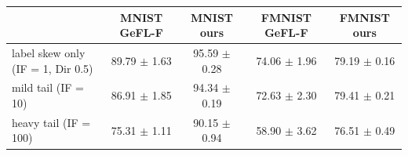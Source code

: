 \begin{tabular}{lcccc}
\toprule
 & MNIST GeFL-F & MNIST ours & FMNIST GeFL-F & FMNIST ours \\
\midrule
label skew only (IF = 1, Dir 0.5) & 89.79 $\pm$ 1.63 & 95.59 $\pm$ 0.28 & 74.06 $\pm$ 1.96 & 79.19 $\pm$ 0.16 \\
mild tail (IF = 10) & 86.91 $\pm$ 1.85 & 94.34 $\pm$ 0.19 & 72.63 $\pm$ 2.30 & 79.41 $\pm$ 0.21 \\
heavy tail (IF = 100) & 75.31 $\pm$ 1.11 & 90.15 $\pm$ 0.94 & 58.90 $\pm$ 3.62 & 76.51 $\pm$ 0.49 \\
\bottomrule
\end{tabular}
